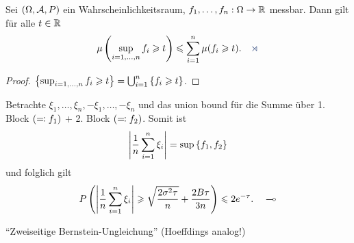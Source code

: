 \begin{lem}
\label{prop:3.5}
Sei $(\Omega,\AA,P)$ ein Wahrscheinlichkeitsraum, $f_1,\ldots,f_n: \Omega\to\R$
messbar. Dann gilt für alle $t\in\R$
\begin{align*}
\mu\left(\sup_{i=1,\ldots,n} f_i \ge t\right) \le
\sum_{i=1}^n \mu(f_i\ge t).\fishhere
\end{align*}
\end{lem}
\begin{proof}
$\setd{\sup_{i=1,\ldots,n} f_i \ge t} = \bigcup_{i=1}^n \setd{f_i\ge
t}$.\qedhere
\end{proof}

\begin{bem*}
Betrachte $\xi_1,\ldots,\xi_n,-\xi_1,\ldots,-\xi_n$ und das union bound für die
Summe über  1. Block $(\defr f_1)$ + 2. Block $(\defr f_2)$. Somit ist
\begin{align*}
\abs{\frac{1}{n}\sum_{i=1}^n \xi_i} = \sup\setd{f_1,f_2} 
\end{align*}
und folglich gilt
\begin{align*}
P \left(\abs{\frac{1}{n} \sum_{i=1}^n\xi_i } \ge \sqrt{\frac{2\sigma^2\tau}{n}}
+ \frac{2B\tau}{3 n} \right) \le 2e^{-\tau}.\maphere
\end{align*}
\end{bem*}
"`Zweiseitige Bernstein-Ungleichung"' (Hoeffdings analog!)
